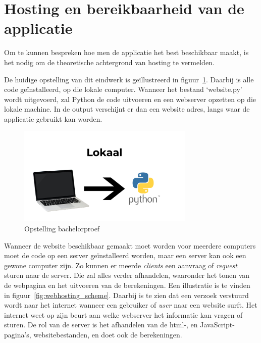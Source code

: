 \section{Hosting en bereikbaarheid van de applicatie}
Om te kunnen bespreken hoe men de applicatie het best beschikbaar maakt, is het nodig om de theoretische achtergrond van hosting te vermelden.

De huidige opstelling van dit eindwerk is geïllustreerd in figuur~\ref{fig:opstelling_bachelorproef}. Daarbij is alle code geïnstalleerd, op die lokale computer. Wanneer het bestand `website.py' wordt uitgevoerd, zal Python de code uitvoeren en een webserver opzetten op die lokale machine. In de output verschijnt er dan een website adres, langs waar de applicatie gebruikt kan worden.

\begin{figure}
    \centering
    \includegraphics[width=0.75\textwidth]{./img/lokaal_website}
    \caption{\label{fig:opstelling_bachelorproef} Opstelling bachelorproef}
\end{figure}

Wanneer de website beschikbaar gemaakt moet worden voor meerdere computers moet de code op een server geïnstalleerd worden, maar een server kan ook een gewone computer zijn. Zo kunnen er meerde \textit{clients} een aanvraag of \textit{request} sturen naar de server. Die zal alles verder afhandelen, waaronder het tonen van de webpagina en het uitvoeren van de berekeningen. Een illustratie is te vinden in figuur~\ref{fig:webhosting_scheme}. Daarbij is te zien dat een verzoek verstuurd wordt naar het internet wanneer een gebruiker of \textit{user} naar een website surft. Het internet weet op zijn beurt aan welke webserver het informatie kan vragen of sturen.
De rol van de server is het afhandelen van de html-, en JavaScript-pagina's, websitebestanden, en doet ook de berekeningen.


